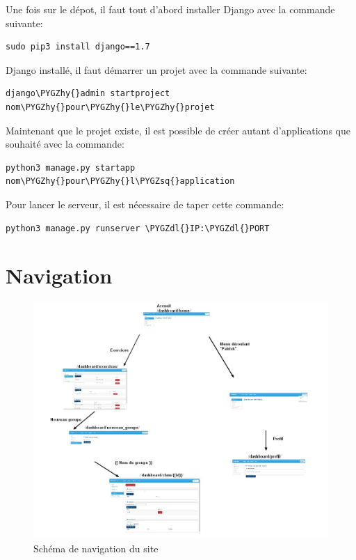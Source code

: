 \documentclass[a4paper,10pt,french]{sphinxmanual}
\def\PYGZdl{\char`\$}
\def\PYGZhy{\char`\-}
\def\PYGZsq{\char`\'}
\renewcommand\PYGZsq{\textquotesingle}
\begin{document}
Une fois sur le dépot, il faut tout d'abord installer Django avec
la commande suivante:

\begin{Verbatim}[commandchars=\\\{\}]
sudo pip3 install django==1.7
\end{Verbatim}

Django installé, il faut démarrer un projet avec la commande suivante:

\begin{Verbatim}[commandchars=\\\{\}]
django\PYGZhy{}admin startproject nom\PYGZhy{}pour\PYGZhy{}le\PYGZhy{}projet
\end{Verbatim}

Maintenant que le projet existe, il est possible de créer autant d'applications
que souhaité avec la commande:

\begin{Verbatim}[commandchars=\\\{\}]
python3 manage.py startapp nom\PYGZhy{}pour\PYGZhy{}l\PYGZsq{}application
\end{Verbatim}

Pour lancer le serveur, il est nécessaire de taper cette commande:

\begin{Verbatim}[commandchars=\\\{\}]
python3 manage.py runserver \PYGZdl{}IP:\PYGZdl{}PORT
\end{Verbatim}


\section{Navigation}
\label{documentation:navigation}\begin{figure}[htbp]
\centering
\capstart

\includegraphics[width=0.600\linewidth]{navigation.jpg}
\caption{Schéma de navigation du site}\end{figure}
\end{document}
